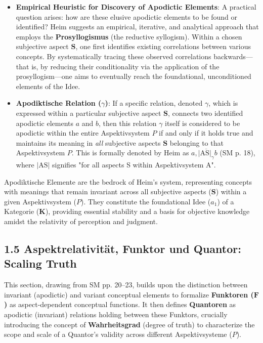 \documentclass[12pt]{article}
\newcommand{\kategorie}{\bm{K}}
\newcommand{\conceptualsyndrome}{a} %
\newcommand{\aspektivsystem}{P}
\newcommand{\funktor}{\bm{F}}
\begin{document}
\begin{itemize}
    \item \textbf{Empirical Heuristic for Discovery of Apodictic Elements}: A practical question arises: how are these elusive apodictic elements to be found or identified? Heim suggests an empirical, iterative, and analytical approach that employs the \textbf{Prosyllogismus} (the reductive syllogism). Within a chosen subjective aspect \( \mathbf{S} \), one first identifies existing correlations between various concepts. By systematically tracing these observed correlations backwards—that is, by reducing their conditionality via the application of the prosyllogism—one aims to eventually reach the foundational, unconditioned elements of the Idee. 
    \item \textbf{Apodiktische Relation (\( \gamma \))}: If a specific relation, denoted \( \gamma \), which is expressed within a particular subjective aspect \( \mathbf{S} \), connects two identified apodictic elements \( a \) and \( b \), then this relation \( \gamma \) itself is considered to be apodictic within the entire Aspektivsystem \( \aspektivsystem \) if and only if it holds true and maintains its meaning in \textit{all} subjective aspects \( \mathbf{S} \) belonging to that Aspektivsystem \( \aspektivsystem \). This is formally denoted by Heim as \( a, \overline{|\mathrm{AS}|_{\gamma}} b \) (SM p. 18), where \(|\mathrm{AS}|\) signifies "for all aspects S within Aspektivsystem A".
\end{itemize}

Apodiktische Elemente are the bedrock of Heim's system, representing concepts with meanings that remain invariant across all subjective aspects (\(\mathbf{S}\)) within a given Aspektivsystem (\(\aspektivsystem\)). They constitute the foundational Idee (\(\conceptualsyndrome_1\)) of a Kategorie (\(\kategorie\)), providing essential stability and a basis for objective knowledge amidst the relativity of perception and judgment.

\subsection{1.5 Aspektrelativität, Funktor und Quantor: Scaling Truth}
\label{sec:quantor}

This section, drawing from SM pp. 20--23, builds upon the distinction between invariant (apodictic) and variant conceptual elements to formalize \textbf{Funktoren (\(\funktor\))} as aspect-dependent conceptual functions. It then defines \textbf{Quantoren} as apodictic (invariant) relations holding between these Funktors, crucially introducing the concept of \textbf{Wahrheitsgrad} (degree of truth) to characterize the scope and scale of a Quantor's validity across different Aspektivsysteme (\(\aspektivsystem\)).
\end{document}

